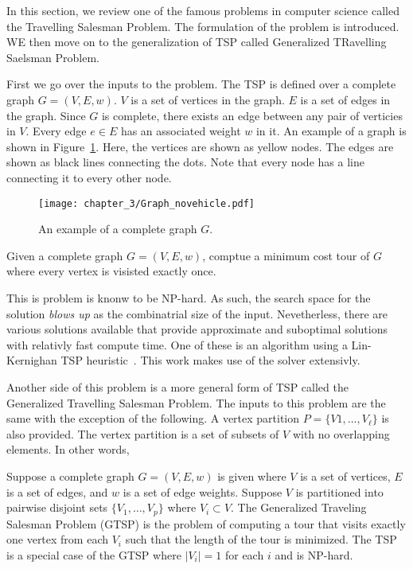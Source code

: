 \documentclass[../main.tex]{subfiles}
\begin{document}
In this section, we review one of the famous problems in computer science called the Travelling Salesman Problem. The formulation of the problem is introduced. WE then move on to the generalization of TSP called Generalized TRavelling Saelsman Problem.

First we go over the inputs to the problem. The TSP is defined over a complete graph $G=(V,E,w)$. $V$ is a set of vertices in the graph. $E$ is a set of edges in the graph. Since $G$ is complete, there exists an edge between any pair of verticies in $V$. Every edge $e\in E$ has an associated weight $w$ in it. An example of a graph is shown in Figure~\ref{fig:complete_graph}. Here, the vertices are shown as yellow nodes. The edges are shown as black lines connecting the dots. Note that every node has a line connecting it to every other node.
\begin{figure}
	\centering
	\texttt{[image: chapter\_3/Graph\_novehicle.pdf]}
	\caption{An example of a complete graph $G$.}
	\label{fig:complete_graph}
\end{figure}


\begin{problem}
Given a complete graph $G=(V,E,w)$, comptue a minimum cost tour of $G$ where every vertex is visisted exactly once.
\end{problem}

This is problem is knonw to be NP-hard. As such, the search space for the solution \emph{blows up} as the combinatrial size of the input. Nevetherless, there are various solutions available that provide approximate and suboptimal solutions with relativly fast compute time. One of these is an algorithm using a Lin-Kernighan TSP heuristic~\cite{helsgaun2009general}. This work makes use of the solver extensivly.

Another side of this problem is a more general form of TSP called the Generalized Travelling Salesman Problem. The inputs to this problem are the same with the exception of the following. A vertex partition $P=\{V1,\ldots,V_{\ell}\}$ is also provided. The vertex partition is a set of subsets of $V$ with no overlapping elements. In other words, 



Suppose a complete graph $G=(V,E,w)$ is given where $V$ is a set of vertices, $E$ is a set of edges, and $w$ is a set of edge weights. Suppose $V$ is partitioned into pairwise disjoint sets $\{V_1,\ldots,V_p\}$ where $V_i\subset V$. The Generalized Traveling Salesman Problem (GTSP) is the problem of computing a tour that visits exactly one vertex from each $V_i$ such that the length of the tour is minimized. The TSP is a special case of the GTSP where $|V_i|=1$ for each $i$ and is NP-hard.
\end{document}
